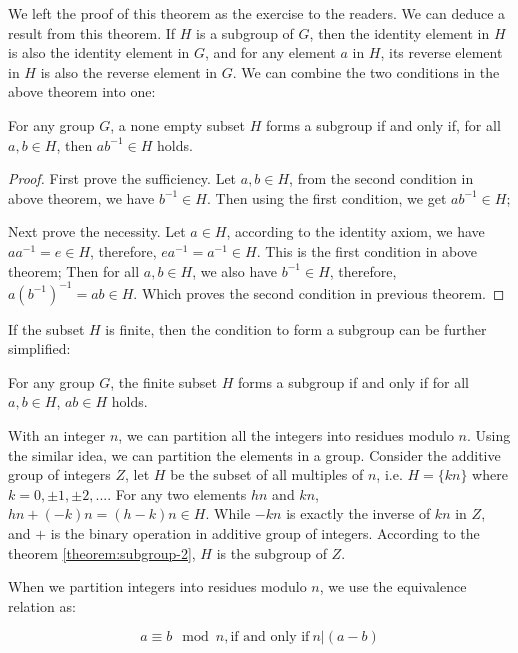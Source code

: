 \documentclass{article}
\begin{document}
We left the proof of this theorem as the exercise to the readers. We can deduce a result from this theorem. If $H$ is a subgroup of $G$, then the identity element in $H$ is also the identity element in $G$, and for any element $a$ in $H$, its reverse element in $H$ is also the reverse element in $G$. We can combine the two conditions in the above theorem into one:

\begin{theorem}
For any group $G$, a none empty subset $H$ forms a subgroup if and only if, for all $a, b \in H$, then $ab^{-1} \in H$ holds.
\label{theorem:subgroup-2}
\end{theorem}

\begin{proof}
First prove the sufficiency. Let $a, b \in H$, from the second condition in above theorem, we have $b^{-1} \in H$. Then using the first condition, we get $ab^{-1} \in H$;

Next prove the necessity. Let $a \in H$, according to the identity axiom, we have $aa^{-1} = e \in H$, therefore, $ea^{-1} = a^{-1} \in H$. This is the first condition in above theorem; Then for all $a, b \in H$, we also have $b^{-1} \in H$, therefore, $a(b^{-1})^{-1} = ab \in H$. Which proves the second condition in previous theorem.
\end{proof}

If the subset $H$ is finite, then the condition to form a subgroup can be further simplified:

\begin{theorem}
For any group $G$, the finite subset $H$ forms a subgroup if and only if for all $a, b \in H$, $ab \in H$ holds.
\end{theorem}

With an integer $n$, we can partition all the integers into residues modulo $n$. Using the similar idea, we can partition the elements in a group. Consider the additive group of integers $Z$, let $H$ be the subset of all multiples of $n$, i.e. $H = \{ kn \}$ where $k = 0, \pm 1, \pm 2, ...$. For any two elements $hn$ and $kn$, $hn + (-k)n = (h - k)n \in H$. While $-kn$ is exactly the inverse of $kn$ in $Z$, and $+$ is the binary operation in additive group of integers. According to the theorem \ref{theorem:subgroup-2}, $H$ is the subgroup of $Z$.

When we partition integers into residues modulo $n$, we use the equivalence relation as:

\[
a \equiv b \mod n, \text{if and only if}\ n | (a - b)
\]
\end{document}

